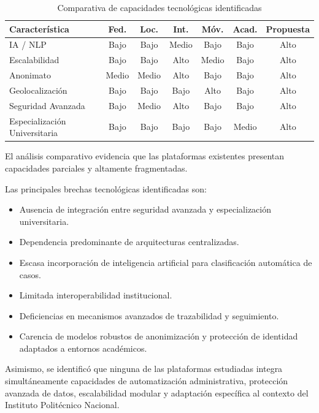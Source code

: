 \begin{table}[htbp]
\centering
\small
\begin{tabular}{|l|c|c|c|c|c|c|}
\hline
\textbf{Característica} & \textbf{Fed.} & \textbf{Loc.} & \textbf{Int.} & \textbf{Móv.} & \textbf{Acad.} & \textbf{Propuesta} \\ \hline

IA / NLP & Bajo & Bajo & Medio & Bajo & Bajo & Alto \\ \hline
Escalabilidad & Bajo & Bajo & Alto & Medio & Bajo & Alto \\ \hline
Anonimato & Medio & Medio & Alto & Bajo & Bajo & Alto \\ \hline
Geolocalización & Bajo & Bajo & Bajo & Alto & Bajo & Alto \\ \hline
Seguridad Avanzada & Bajo & Medio & Alto & Bajo & Bajo & Alto \\ \hline
Especialización Universitaria & Bajo & Bajo & Bajo & Bajo & Medio & Alto \\ \hline

\end{tabular}

\caption{Comparativa de capacidades tecnológicas identificadas}
\label{tab:comparativa}
\end{table}

\begin{flushleft}
\justifying

El análisis comparativo evidencia que las plataformas existentes presentan capacidades parciales y altamente fragmentadas.

Las principales brechas tecnológicas identificadas son:

\begin{itemize}

    \item Ausencia de integración entre seguridad avanzada y especialización universitaria.

    \item Dependencia predominante de arquitecturas centralizadas.

    \item Escasa incorporación de inteligencia artificial para clasificación automática de casos.

    \item Limitada interoperabilidad institucional.

    \item Deficiencias en mecanismos avanzados de trazabilidad y seguimiento.

    \item Carencia de modelos robustos de anonimización y protección de identidad adaptados a entornos académicos.

\end{itemize}

Asimismo, se identificó que ninguna de las plataformas estudiadas integra simultáneamente capacidades de automatización administrativa, protección avanzada de datos, escalabilidad modular y adaptación específica al contexto del Instituto Politécnico Nacional.

\end{flushleft}

